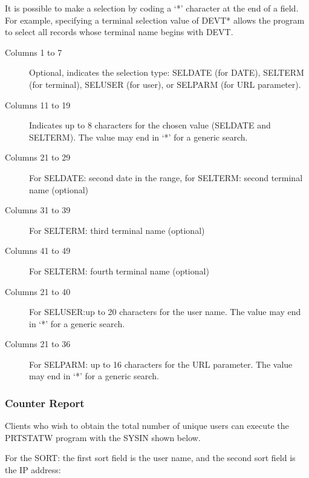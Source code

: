 \documentclass[letterpaper,10pt,english]{sphinxmanual}
\begin{document}
It is possible to make a  selection by coding a ‘*’ character at the end of a field. For example, specifying a terminal selection value of DEVT* allows the program to select all records whose terminal name begins with DEVT.
\begin{description}
\item[{Columns 1 to 7}] \leavevmode
Optional, indicates the selection type: SELDATE (for DATE), SELTERM (for terminal), SELUSER (for user), or SELPARM (for URL parameter).

\item[{Columns 11 to 19}] \leavevmode
Indicates up to 8 characters for the chosen value (SELDATE and SELTERM). The value may end in ‘*’ for a generic search.

\item[{Columns 21 to 29}] \leavevmode
For SELDATE: second date in the range, for SELTERM: second terminal name (optional)

\item[{Columns 31 to 39}] \leavevmode
For SELTERM: third terminal name (optional)

\item[{Columns 41 to 49}] \leavevmode
For SELTERM: fourth terminal name (optional)

\item[{Columns 21 to 40}] \leavevmode
For SELUSER:up to 20 characters for the user name. The value may end in ‘*’ for a generic search.

\item[{Columns 21 to 36}] \leavevmode
For SELPARM: up to 16 characters for the URL parameter. The value  may end in ‘*’ for a generic search.

\end{description}


\subsubsection{Counter Report}
\label{\detokenize{audit_operations_ and_performance:counter-report}}
Clients who wish to obtain the total number of unique users can execute the PRTSTATW program with the SYSIN shown below.

For the SORT: the first sort field is the user name, and the second sort field is the IP address:

\begin{sphinxVerbatim}[commandchars=\\\{\}]
  
 
\end{sphinxVerbatim}
\end{document}
